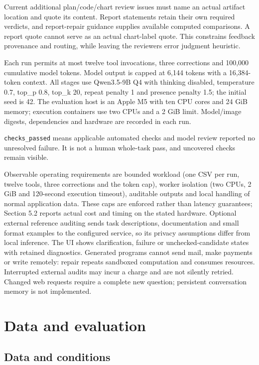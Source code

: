 Current additional plan/code/chart review issues must name an actual artifact location and quote its content. Report statements retain their own required verdicts, and report-repair guidance supplies available computed comparisons. A report quote cannot serve as an actual chart-label quote. This constrains feedback provenance and routing, while leaving the reviewer\textquotesingle s error judgment heuristic.

Each run permits at most twelve tool invocations, three corrections and 100,000 cumulative model tokens. Model output is capped at 6,144 tokens with a 16,384-token context. All stages use Qwen3.5-9B Q4 with thinking disabled, temperature 0.7, top\_p 0.8, top\_k 20, repeat penalty 1 and presence penalty 1.5; the initial seed is 42. The evaluation host is an Apple M5 with ten CPU cores and 24 GiB memory; execution containers use two CPUs and a 2 GiB limit. Model/image digests, dependencies and hardware are recorded in each run.

\texttt{checks\_passed} means applicable automated checks and model review reported no unresolved failure. It is not a human whole-task pass, and uncovered checks remain visible.

Observable operating requirements are bounded workload (one CSV per run, twelve tools, three corrections and the token cap), worker isolation (two CPUs, 2 GiB and 120-second execution timeout), auditable outputs and local handling of normal application data. These caps are enforced rather than latency guarantees; Section 5.2 reports actual cost and timing on the stated hardware. Optional external reference auditing sends task descriptions, documentation and small format examples to the configured service, so its privacy assumptions differ from local inference. The UI shows clarification, failure or unchecked-candidate states with retained diagnostics. Generated programs cannot send mail, make payments or write remotely: repair repeats sandboxed computation and consumes resources. Interrupted external audits may incur a charge and are not silently retried. Changed web requests require a complete new question; persistent conversation memory is not implemented.

\section{Data and evaluation}\label{data-and-evaluation}

\subsection{Data and conditions}\label{data-and-conditions}

